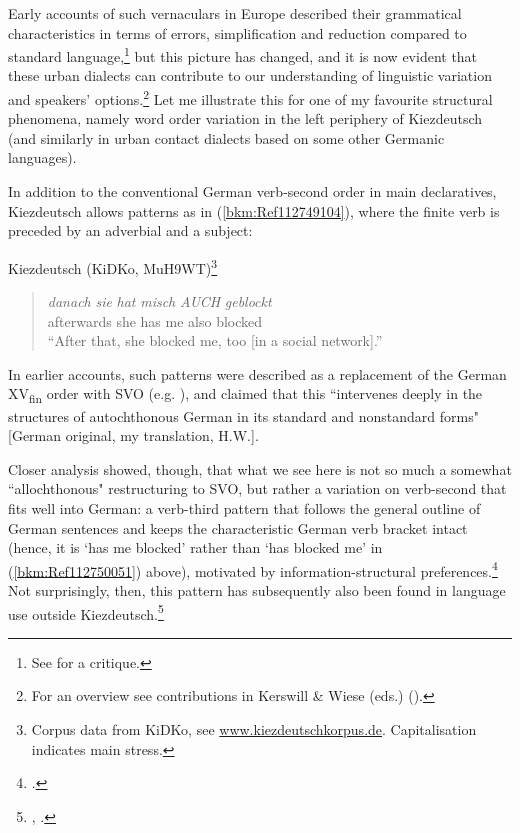 Early accounts of such vernaculars in Europe described their grammatical characteristics in terms of errors, simplification and reduction compared to standard language,\footnote{See \citet{Wiese2009} for a critique.} but this picture has changed, and it is now evident that these urban dialects can contribute to our understanding of linguistic variation and speakers’ options.\footnote{For an overview see contributions in Kerswill \& Wiese (eds.) (\citeyear{KerswillWieseEds2022}).} Let me illustrate this for one of my favourite structural phenomena, namely word order variation in the left periphery of Kiezdeutsch (and similarly in urban contact dialects based on some other Germanic languages).

In addition to the conventional German verb-second order in main declaratives, Kiezdeutsch allows patterns as in (\ref{bkm:Ref112749104}), where the finite verb is preceded by an adverbial and a subject:


\ea\label{ex:key:3}\label{bkm:Ref112749104}\label{bkm:Ref112750051}Kiezdeutsch (KiDKo, MuH9WT)\footnote{Corpus data from KiDKo, see \url{www.kiezdeutschkorpus.de}. Capitalisation
indicates main stress.}
\begin{quote}
\gll \textit{danach} \textit{sie} \textit{hat} \textit{misch} \textit{AUCH} \textit{geblockt} \\
afterwards she has me also blocked  \\
\trans “After that, she blocked me, too [in a social network].”
\end{quote}
\z



In earlier accounts, such patterns were described as a replacement of the German XV\textsubscript{fin} order with SVO (e.g. \citealt{Auer2003}), and \citet[37]{Auer2013} claimed that this “intervenes deeply in the structures of autochthonous German in its standard and nonstandard forms" [German original, my translation, H.W.].

Closer analysis showed, though, that what we see here is not so much a somewhat “allochthonous" restructuring to SVO, but rather a variation on verb-second that fits well into German: a verb-third pattern that follows the general outline of German sentences and keeps the characteristic German verb bracket intact (hence, it is `has me blocked' rather than `has blocked me' in (\ref{bkm:Ref112750051}) above), motivated by information-structural preferences.\footnote{\citet{Wiese2009,Wiese2011,Wiese2013}.} Not surprisingly, then, this pattern has subsequently also been found in language use outside Kiezdeutsch.\footnote{\citet{WieseMüller2018}, \citet{Bunk2020}.}

